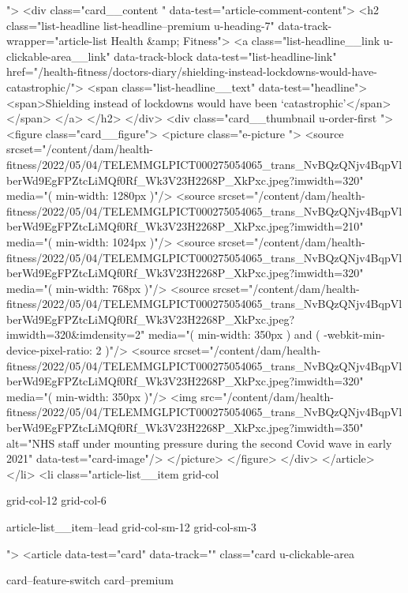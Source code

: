 {{{			 ">
<div class="card__content " data-test="article-comment-content">
<h2 class="list-headline list-headline--premium u-heading-7" data-track-wrapper="article-list Health &amp; Fitness">
<a class="list-headline__link u-clickable-area__link" data-track-block data-test="list-headline-link" href="/health-fitness/doctors-diary/shielding-instead-lockdowns-would-have-catastrophic/">
<span class="list-headline__text" data-test="headline">
<span>Shielding instead of lockdowns would have been ‘catastrophic’</span>
</span>
</a>
</h2>
</div>
<div class="card__thumbnail u-order-first ">
<figure class="card__figure">
<picture class="e-picture   ">
<source srcset="/content/dam/health-fitness/2022/05/04/TELEMMGLPICT000275054065_trans_NvBQzQNjv4BqpVlberWd9EgFPZtcLiMQf0Rf_Wk3V23H2268P_XkPxc.jpeg?imwidth=320" media="( min-width: 1280px )"/>
<source srcset="/content/dam/health-fitness/2022/05/04/TELEMMGLPICT000275054065_trans_NvBQzQNjv4BqpVlberWd9EgFPZtcLiMQf0Rf_Wk3V23H2268P_XkPxc.jpeg?imwidth=210" media="( min-width: 1024px )"/>
<source srcset="/content/dam/health-fitness/2022/05/04/TELEMMGLPICT000275054065_trans_NvBQzQNjv4BqpVlberWd9EgFPZtcLiMQf0Rf_Wk3V23H2268P_XkPxc.jpeg?imwidth=320" media="( min-width: 768px )"/>
<source srcset="/content/dam/health-fitness/2022/05/04/TELEMMGLPICT000275054065_trans_NvBQzQNjv4BqpVlberWd9EgFPZtcLiMQf0Rf_Wk3V23H2268P_XkPxc.jpeg?imwidth=320&imdensity=2" media="( min-width: 350px ) and ( -webkit-min-device-pixel-ratio: 2 )"/>
<source srcset="/content/dam/health-fitness/2022/05/04/TELEMMGLPICT000275054065_trans_NvBQzQNjv4BqpVlberWd9EgFPZtcLiMQf0Rf_Wk3V23H2268P_XkPxc.jpeg?imwidth=320" media="( min-width: 350px )"/>
<img src="/content/dam/health-fitness/2022/05/04/TELEMMGLPICT000275054065_trans_NvBQzQNjv4BqpVlberWd9EgFPZtcLiMQf0Rf_Wk3V23H2268P_XkPxc.jpeg?imwidth=350" alt="NHS staff under mounting pressure during the second Covid wave in early 2021" data-test="card-image"/>
</picture>
</figure>
</div>
</article>
</li>
<li class="article-list__item
				grid-col
				
				
				
				grid-col-12
				grid-col-6
				
				
				
				
				article-list__item--lead grid-col-sm-12
				grid-col-sm-3
				
				
				">
<article data-test="card" data-track="" class="card
			u-clickable-area
			
			card--feature-switch
			card--premium
			
			
			
}}}
